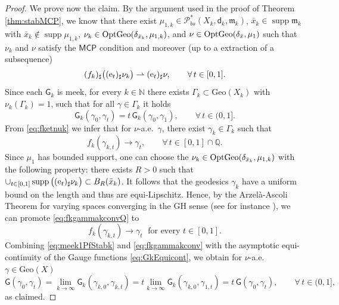 \documentclass[11pt,a4paper]{article}
\theoremstyle{plain}
\theoremstyle{definition}
\theoremstyle{remark}
\numberwithin{equation}{section}
\newcommand{\N}{\mathbb{N}} %
\newcommand{\Q}{\mathbb{Q}}
\DeclareMathOperator{\supp}{\mathrm{supp}}
\newcommand{\Geo}{\mathrm{Geo}}
\newcommand{\MCP}{\mathsf{MCP}}
\newcommand{\OptGeo}{{\rm OptGeo}}
\newcommand{\Prob}{\mathcal{P}}
\newcommand{\mm}{\mathfrak m}
\newcommand{\ee}{{\rm e}}
\newcommand{\sfd}{\mathsf d}
\newcommand{\sfG}{\mathsf G}
\begin{document}
\begin{proof}
We prove now the claim. By the argument used in the proof of Theorem \ref{thm:stabMCP}, we know that there exist $\mu_{1,k}  \in  \Prob_{bs}^{*}(X_{k},\sfd_{k},\mm_{k})$, $\bar{x}_k\in\supp\mm_k$ with $\bar{x}_{k}\notin  \supp \mu_{1,k}$, $\nu_k \in \OptGeo(\delta_{\bar{x}_k},\mu_{1,k})$, and $\nu \in \OptGeo(\delta_{\bar{x}},\mu_1)$  such that $\nu_k$ and $\nu$ satisfy the $\MCP$ condition and moreover (up to a extraction of a subsequence)   
\begin{equation}\label{eq:fketnuk}
(f_k)_{\sharp}\big( (\ee_t)_{\sharp} \nu_k \big)\rightharpoonup (\ee_t)_{\sharp} \nu,\qquad \forall\,t\in [0,1]. 
\end{equation}
Since each $\sfG_k$ is meek, for every $k\in \N$ there exists $\Gamma_k \subset \Geo(X_k)$ with $\nu_k(\Gamma_k)=1$, such that for all $\gamma \in \Gamma_k$ it holds
\begin{equation} \label{eq:meek1PfStabk}
\sfG_k(\gamma_0,\gamma_t) = t\, \sfG_k(\gamma_0,\gamma_1), \qquad \forall\, t\in (0,1].
\end{equation}
From \eqref{eq:fketnuk} we infer that for $\nu$-a.e.\ $\gamma$, there exist $\gamma_k\in \Gamma_k$ such that 
\begin{equation}\label{eq:fkgammakconvQ}
f_k(\gamma_{k,t})\to \gamma_t, \qquad \forall\, t\in [0,1]\cap \Q.
\end{equation}
 Since $\mu_1$ has bounded support, one can choose the
$\nu_k \in \OptGeo(\delta_{\bar{x}_k},\mu_{1,k})$ with the following property: there exists $R>0$ such that  $\cup_{t\in [0,1]} \supp \big( (\ee_t)_{\sharp} \nu_k \big)\subset B_R(\bar x_k)$. It follows that the geodesics $\gamma_k$ have a uniform bound on the length and thus are equi-Lipschitz.  Hence, by the Arzelà-Ascoli Theorem for varying spaces converging in the GH sense (see for instance \cite[Prop.\@ 27.20]{Vil}), we can promote \eqref{eq:fkgammakconvQ} to 
\begin{equation}\label{eq:fkgammakconv}
f_k(\gamma_{k,t})\to \gamma_t \; \text{ for every $t\in [0,1]$}.
\end{equation}
Combining \eqref{eq:meek1PfStabk} and \eqref{eq:fkgammakconv}  with the asymptotic equi-continuity of the Gauge functions \eqref{eq:GkEquicont}, we obtain for $\nu$-a.e.\ $\gamma\in\Geo(X)$
\begin{equation}
\sfG(\gamma_0,\gamma_t)= \lim_{k\to \infty} \sfG_k(\gamma_{k,0},\gamma_{k,t})= t \lim_{k\to \infty} \sfG_k(\gamma_{k,0},\gamma_{1,t})= t\,  \sfG(\gamma_0,\gamma_t), \qquad \forall\, t\in (0,1],
\end{equation}
as claimed.




\end{proof}
\end{document}
